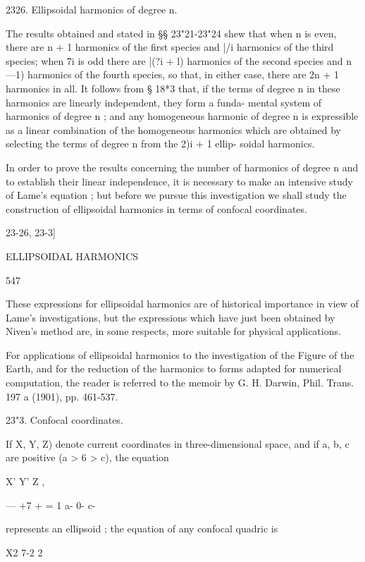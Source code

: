 {{2326. Ellipsoidal harmonics of degree n.

The results obtained and stated in §§ 23"21-23"24 shew that when n is
even, there are n + 1 harmonics of the first species and |/i harmonics
of the third species; when 7i is odd there are |(?i + l) harmonics of
the second species and n —1) harmonics of the fourth species, so that,
in either case, there are 2n + 1 harmonics in all. It follows from §
18*3 that, if the terms of degree n in these harmonics are linearly
independent, they form a funda- mental system of harmonics of degree n
; and any homogeneous harmonic of degree n is expressible as a linear
combination of the homogeneous harmonics which are obtained by
selecting the terms of degree n from the 2)i + 1 ellip- soidal
harmonics.

In order to prove the results concerning the number of harmonics of
degree n and to establish their linear independence, it is necessary
to make an intensive study of Lame's equation ; but before we pursue
this investigation we shall study the construction of ellipsoidal
harmonics in terms of confocal coordinates.



23-26, 23-3]



ELLIPSOIDAL HARMONICS



547



These expressions for ellipsoidal harmonics are of historical
importance in view of Lame's investigations, but the expressions which
have just been obtained by Niven's method are, in some respects, more
suitable for physical applications.

For applications of ellipsoidal harmonics to the investigation of the
Figure of the Earth, and for the reduction of the harmonics to forms
adapted for numerical computation, the reader is referred to the
memoir by G. H. Darwin, Phil. Trans. 197 a (1901), pp. 461-537.

23"3. Confocal coordinates.

If X, Y, Z) denote current coordinates in three-dimensional space, and
if a, b, c are positive (a > 6 > c), the equation

X' Y' Z ,

— +7 + = 1 a- 0- c-

represents an ellipsoid ; the equation of any confocal quadric is

X2 7-2 2



}}

